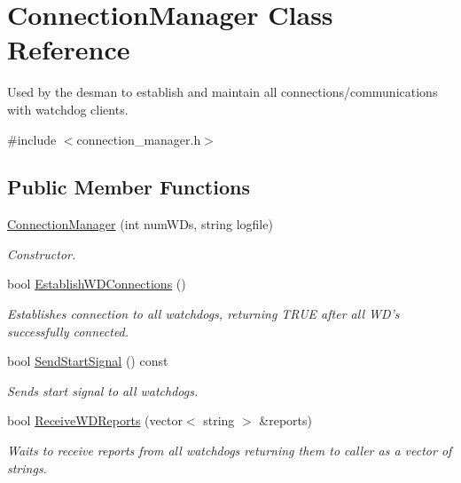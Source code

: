 \hypertarget{classConnectionManager}{\section{Connection\-Manager Class Reference}
\label{classConnectionManager}
}


Used by the desman to establish and maintain all connections/communications with watchdog clients.  




{\ttfamily \#include $<$connection\-\_\-manager.\-h$>$}

\subsection*{Public Member Functions}
\begin{DoxyCompactItemize}
\item 
\hyperlink{classConnectionManager_a1d24557006d4a5d2745952148d61037e}{Connection\-Manager} (int num\-W\-Ds, string logfile)
\begin{DoxyCompactList}\small\item\em Constructor. \end{DoxyCompactList}\item 
bool \hyperlink{classConnectionManager_aeed94353d6c54ffe670d7d5b7482a6d2}{Establish\-W\-D\-Connections} ()
\begin{DoxyCompactList}\small\item\em Establishes connection to all watchdogs, returning T\-R\-U\-E after all W\-D's successfully connected. \end{DoxyCompactList}\item 
bool \hyperlink{classConnectionManager_a25ebd721d4e133f1dfc4141d8ed8071f}{Send\-Start\-Signal} () const 
\begin{DoxyCompactList}\small\item\em Sends start signal to all watchdogs. \end{DoxyCompactList}\item 
bool \hyperlink{classConnectionManager_a5de1e8cab1108e8e35c06df1999887de}{Receive\-W\-D\-Reports} (vector$<$ string $>$ \&reports)
\begin{DoxyCompactList}\small\item\em Waits to receive reports from all watchdogs returning them to caller as a vector of strings. \end{DoxyCompactList}\end{DoxyCompactItemize}
